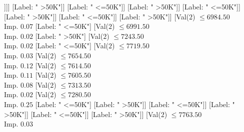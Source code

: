 \documentclass[margin=10pt]{standalone}
\begin{document}
\begin{forest}
																																																			[Label: " <=50K"]
																																																			[Val($2$) $ \leq 6250.50$ \\ Imp. $0.31$
																																																				[Label: " >50K"]
																																																				[Label: " <=50K"]]]]
																																																	[Label: " >50K"]]
																																																[Label: " <=50K"]]
																																															[Label: " >50K"]]
																																														[Label: " <=50K"]]
																																													[Label: " >50K"]]
																																												[Label: " <=50K"]]
																																											[Label: " >50K"]]
																																										[Val($2$) $ \leq 6984.50$ \\ Imp. $0.07$
																																											[Label: " <=50K"]
																																											[Val($2$) $ \leq 6991.50$ \\ Imp. $0.02$
																																												[Label: " >50K"]
																																												[Val($2$) $ \leq 7243.50$ \\ Imp. $0.02$
																																													[Label: " <=50K"]
																																													[Val($2$) $ \leq 7719.50$ \\ Imp. $0.03$
																																														[Val($2$) $ \leq 7654.50$ \\ Imp. $0.12$
																																															[Val($2$) $ \leq 7614.50$ \\ Imp. $0.11$
																																																[Val($2$) $ \leq 7605.50$ \\ Imp. $0.08$
																																																	[Val($2$) $ \leq 7313.50$ \\ Imp. $0.02$
																																																		[Val($2$) $ \leq 7280.50$ \\ Imp. $0.25$
																																																			[Label: " <=50K"]
																																																			[Label: " >50K"]]
																																																		[Label: " <=50K"]]
																																																	[Label: " >50K"]]
																																																[Label: " <=50K"]]
																																															[Label: " >50K"]]
																																														[Val($2$) $ \leq 7763.50$ \\ Imp. $0.03$

\end{forest}
\end{document}
